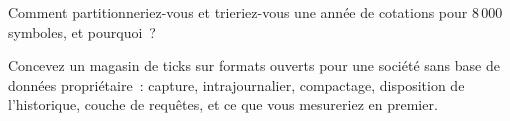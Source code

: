 \begin{interviewq}\label{iq:pl:a-tick-store-on-open-formats:5}
Comment partitionneriez-vous et trieriez-vous une année de cotations pour 8\,000 symboles, et pourquoi~?
\end{interviewq}

\begin{interviewq}\label{iq:pl:a-tick-store-on-open-formats:6}
Concevez un magasin de ticks sur formats ouverts pour une société sans base de données propriétaire~: capture, intrajournalier,
compactage, disposition de l'historique, couche de requêtes, et ce que vous mesureriez en premier.
\end{interviewq}
